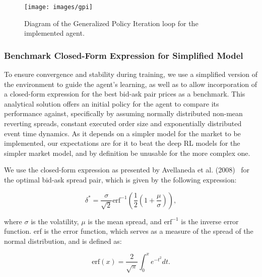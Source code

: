 \begin{figure}[H]
    \centering
    \texttt{[image: images/gpi]}
    \caption{Diagram of the Generalized Policy Iteration loop for the implemented agent.}
    \label{fig:gpi}
\end{figure}

\subsubsection{Benchmark Closed-Form Expression for Simplified Model}
To ensure convergence and stability during training, we use a simplified version of the environment to guide the agent's learning,
as well as to allow incorporation of a closed-form expression for the best bid-ask pair prices as a benchmark.
This analytical solution offers an initial policy for the agent to compare its performance against,
specifically by assuming normally distributed non-mean reverting spreads, constant executed order size and exponentially distributed event time dynamics.
As it depends on a simpler model for the market to be implemented, our expectations are for it to beat the deep RL models for the simpler market model,
and by definition be unusable for the more complex one.

We use the closed-form expression as presented by Avellaneda et al. (2008)~\cite{Avellaneda2008} for the optimal bid-ask spread pair,
which is given by the following expression:

\[
    \delta^* = \frac{\sigma}{\sqrt{2}} \text{erf}^{-1} \left( \frac{1}{2} \left( 1 + \frac{\mu}{\sigma} \right) \right),
\]

where $\sigma$ is the volatility, $\mu$ is the mean spread, and $\text{erf}^{-1}$ is the inverse error function.
erf is the error function, which serves as a measure of the spread of the normal distribution, and is defined as:

\[
    \text{erf}(x) = \frac{2}{\sqrt{\pi}} \int_{0}^{x} e^{-t^2} dt.
\]

